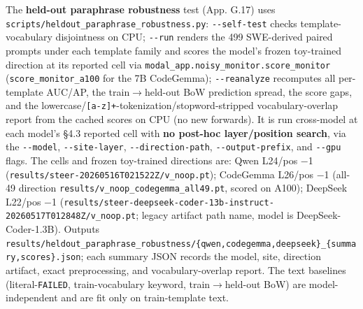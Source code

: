 \documentclass[
  11pt,
  a4paper]{article}
\begin{document}
The \textbf{held-out paraphrase robustness} test (App. G.17) uses
\texttt{scripts/heldout\_paraphrase\_robustness.py}:
\texttt{-\/-self-test} checks template-vocabulary disjointness on CPU;
\texttt{-\/-run} renders the 499 SWE-derived paired prompts under each
template family and scores the model's frozen toy-trained direction at
its reported cell via \texttt{modal\_app.noisy\_monitor.score\_monitor}
(\texttt{score\_monitor\_a100} for the 7B CodeGemma);
\texttt{-\/-reanalyze} recomputes all per-template AUC/AP, the
train\ensuremath{\rightarrow}held-out BoW prediction spread, the score gaps, and the
lowercase/\texttt{{[}a-z{]}+}-tokenization/stopword-stripped
vocabulary-overlap report from the cached scores on CPU (no new
forwards). It is run cross-model at each model's \S{}4.3 reported cell with
\textbf{no post-hoc layer/position search}, via the \texttt{-\/-model},
\texttt{-\/-site-layer}, \texttt{-\/-direction-path},
\texttt{-\/-output-prefix}, and \texttt{-\/-gpu} flags. The cells and
frozen toy-trained directions are: Qwen L24/pos \ensuremath{-}1
(\texttt{results/}\allowbreak\texttt{steer-20260516T021522Z/v\_noop.pt});
CodeGemma L26/pos \ensuremath{-}1 (all-49 direction
\texttt{results/}\allowbreak\texttt{v\_noop\_codegemma\_all49.pt},
scored on A100); DeepSeek L22/pos \ensuremath{-}1
(\texttt{results/}\allowbreak\texttt{steer-deepseek-coder-13b-instruct-}\allowbreak\texttt{20260517T012848Z/v\_noop.pt};
legacy artifact path name, model is DeepSeek-Coder-1.3B). Outputs
\texttt{results/}\allowbreak\texttt{heldout\_paraphrase\_robustness/}\allowbreak\texttt{\{qwen,codegemma,deepseek\}\_\{summary,scores\}.json};
each summary JSON records the model, site, direction artifact, exact
preprocessing, and vocabulary-overlap report. The text baselines
(literal-\texttt{FAILED}, train-vocabulary keyword, train\ensuremath{\rightarrow}held-out BoW)
are model-independent and are fit only on train-template text.
\end{document}
